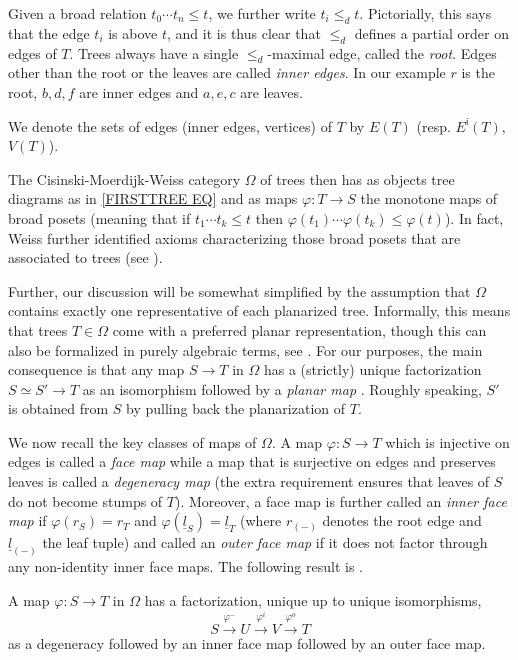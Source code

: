 \documentclass[a4paper,10pt
,draft
]{article}%
\begin{document}
Given a broad relation $t_0 \cdots t_n \leq t$,
we further write $t_i \leq_d t$.
Pictorially, this says that the edge $t_i$ is above $t$,
and it is thus clear that $\leq_d$ defines a partial order on edges of $T$.
Trees always have a single $\leq_d$-maximal edge, called the \textit{root}. Edges other than the root or the leaves are called \textit{inner edges}. In our example $r$ is the root, $b,d,f$ are inner edges and $a,e,c$ are leaves. 

We denote the sets of edges (inner edges, vertices) of $T$ by
$E(T)$ (resp. $E^{\mathsf{i}}(T)$, $V(T)$).

The Cisinski-Moerdijk-Weiss category $\Omega$ of trees then has as objects tree diagrams as in \eqref{FIRSTTREE EQ}
and as maps $\varphi \colon T \to S$ the monotone maps of broad posets
(meaning that if $t_1 \cdots t_k \leq t$ then
$\varphi(t_1) \cdots \varphi(t_k) \leq \varphi(t)$).
In fact, Weiss further identified axioms characterizing those broad posets that are associated to trees (see \cite[Defs. 5.1 and 5.9]{Per17}).

Further, our discussion will be somewhat simplified by the assumption that $\Omega$
contains exactly one representative of each planarized tree.
Informally, this means that trees $T \in \Omega$
come with a preferred planar representation,
though this can also be formalized in purely algebraic terms, see \cite[\S 3.1]{BP17}.
For our purposes, the main consequence is that any map 
$S \to T$ in $\Omega$ has a (strictly) unique factorization
$S \simeq S' \to T$ as an isomorphism followed by a \textit{planar map} \cite[Prop. 3.21]{BP17}. 
Roughly speaking, $S'$ is obtained from $S$
by pulling back the planarization of $T$.

We now recall the key classes of maps of $\Omega$.
A map $\varphi \colon S \to T$ which is injective on edges is called a \textit{face map}
while a map that is surjective on edges and preserves leaves is called a \textit{degeneracy map}
(the extra requirement ensures that leaves of $S$ do not become stumps of $T$).
Moreover, a face map is further called an \textit{inner face map}
if $\varphi(r_S) = r_T$ and 
$\varphi(\underline{l}_S) = \underline{l}_T$ 
(where $r_{(-)}$ denotes the root edge and $\underline{l}_{(-)}$ the leaf tuple)
and called an \textit{outer face map} if it does not factor through any non-identity inner face maps.
The following result is \cite[Cor. 3.32]{BP17}.
\begin{proposition}\label{UNIQUEFACT PROP}
	A map $\varphi \colon S \to T$ in $\Omega$ has a factorization, unique up to unique isomorphisms,
\[
	S \xrightarrow{\varphi^{-}}
	U \xrightarrow{\varphi^{i}}
	V \xrightarrow{\varphi^{o}}
	T	
\]
as a degeneracy followed by an inner face map followed by an outer face map.
\end{proposition}
\end{document}

